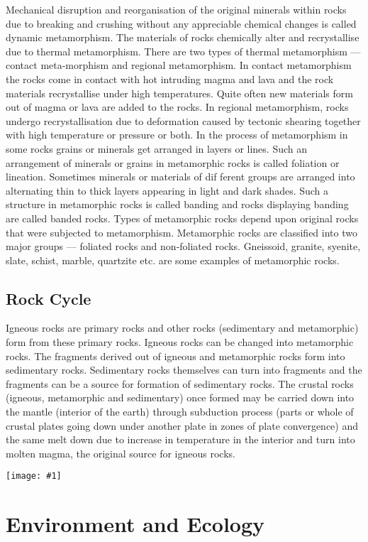 \documentclass[8pt, a4paper, oneside, twocolumn]{extarticle}
\newcommand{\ph}[1]{
    \texttt{[image: \#1]}
}
\begin{document}
Mechanical disruption and reorganisation of the original minerals within rocks due to breaking and crushing without any appreciable chemical changes is called dynamic metamorphism. The materials of rocks chemically alter and recrystallise due to thermal metamorphism. There are two types of thermal metamorphism — contact meta-morphism and regional metamorphism. In contact metamorphism the rocks come in contact with hot intruding magma and lava and the rock materials recrystallise under high temperatures. Quite often new materials form out of magma or lava are added to the rocks. In regional metamorphism, rocks undergo recrystallisation due to deformation caused by tectonic shearing together with high temperature or pressure or both. In the process of metamorphism in some rocks grains or minerals get arranged in layers or lines. Such an arrangement of minerals or grains in metamorphic rocks is called foliation or lineation. Sometimes minerals or materials of dif ferent groups are arranged into alternating thin to thick layers appearing in light and dark shades. Such a structure in metamorphic rocks is called banding and rocks displaying banding are called banded rocks. Types of metamorphic rocks depend upon original rocks that were subjected to metamorphism. Metamorphic rocks are classified into two major groups — foliated rocks and non-foliated rocks. Gneissoid, granite, syenite, slate, schist, marble, quartzite etc. are some examples of metamorphic rocks.

\subsection{Rock Cycle}
Igneous rocks are primary rocks and other rocks (sedimentary and metamorphic) form from these primary rocks. Igneous rocks can be changed into metamorphic rocks. The fragments derived out of igneous and metamorphic rocks form into sedimentary rocks. Sedimentary rocks themselves can turn into fragments and the fragments can be a source for formation of sedimentary rocks. The crustal rocks (igneous, metamorphic and sedimentary) once formed may be carried down into the mantle (interior of the earth) through subduction process (parts or whole of crustal plates going down under another plate in zones of plate convergence) and the same melt down due to increase in temperature in the interior and turn into molten magma, the original source for igneous rocks.

\ph{rockcycle}

\section{Environment and Ecology}
\end{document}

